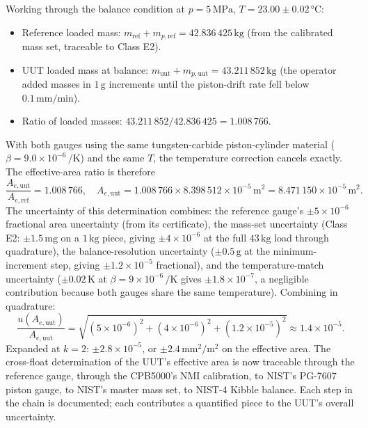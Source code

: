Working through the balance condition at $p = 5\,\si{\mega\pascal}$,
$T = 23.00 \pm 0.02\,\si{\degreeCelsius}$:
\begin{itemize}[leftmargin=*]
  \item Reference loaded mass: $m_{\text{ref}} + m_{p,\text{ref}}
    = 42.836\,425\,\si{\kilo\gram}$ (from the calibrated mass
    set, traceable to Class E2).
  \item UUT loaded mass at balance: $m_{\text{uut}} +
    m_{p,\text{uut}} = 43.211\,852\,\si{\kilo\gram}$ (the
    operator added masses in $1\,\si{\gram}$ increments until
    the piston-drift rate fell below $0.1\,\si{\milli\meter}/
    \text{min}$).
  \item Ratio of loaded masses: $43.211\,852 / 42.836\,425
    = 1.008\,766$.
\end{itemize}
With both gauges using the same tungsten-carbide piston-cylinder
material ($\beta = 9.0 \times 10^{-6}\,\si{\per\kelvin}$) and the
same $T$, the temperature correction cancels exactly. The
effective-area ratio is therefore
\[
\frac{A_{e,\text{uut}}}{A_{e,\text{ref}}} = 1.008\,766,
\quad A_{e,\text{uut}} = 1.008\,766 \times 8.398\,512 \times
10^{-5}\,\si{\meter\squared} = 8.471\,150 \times 10^{-5}\,\si{
\meter\squared}.
\]
The uncertainty of this determination combines: the reference
gauge's $\pm 5 \times 10^{-6}$ fractional area uncertainty (from
its certificate), the mass-set uncertainty (Class E2: $\pm 1.5
\,\si{\milli\gram}$ on a $1\,\si{\kilo\gram}$ piece, giving
$\pm 4 \times 10^{-6}$ at the full $43\,\si{\kilo\gram}$ load
through quadrature), the balance-resolution uncertainty
($\pm 0.5\,\si{\gram}$ at the minimum-increment step, giving
$\pm 1.2 \times 10^{-5}$ fractional), and the temperature-match
uncertainty ($\pm 0.02\,\si{\kelvin}$ at $\beta = 9 \times
10^{-6}\,\si{\per\kelvin}$ gives $\pm 1.8 \times 10^{-7}$, a
negligible contribution because both gauges share the same
temperature). Combining in quadrature:
\[
\frac{u(A_{e,\text{uut}})}{A_{e,\text{uut}}} = \sqrt{
(5 \times 10^{-6})^{2} + (4 \times 10^{-6})^{2} +
(1.2 \times 10^{-5})^{2}}
\approx 1.4 \times 10^{-5}.
\]
Expanded at $k = 2$: $\pm 2.8 \times 10^{-5}$, or
$\pm 2.4\,\si{\milli\meter\squared}/\si{\meter\squared}$ on the
effective area. The cross-float determination of the UUT's
effective area is now traceable through the reference gauge,
through the CPB5000's NMI calibration, to NIST's PG-7607 piston
gauge, to NIST's master mass set, to NIST-4 Kibble balance.
Each step in the chain is documented; each contributes a
quantified piece to the UUT's overall uncertainty.

